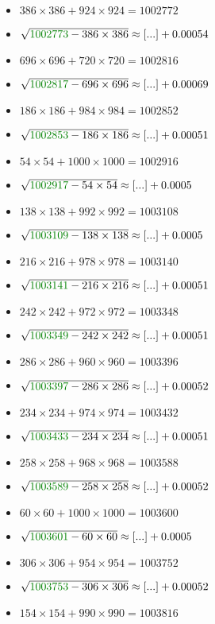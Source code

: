 \documentclass[12pt]{article}
\begin{document}
\begin{multicols}{2}
\begin{itemize}
\item $386\times386 + 924\times924 = 1002772$
\item $\sqrt{ {\color{green!50!black}{1002773}} - 386\times 386 } \approx [...] + 0.00054$
\item $696\times696 + 720\times720 = 1002816$
\item $\sqrt{ {\color{green!50!black}{1002817}} - 696\times 696 } \approx [...] + 0.00069$
\item $186\times186 + 984\times984 = 1002852$
\item $\sqrt{ {\color{green!50!black}{1002853}} - 186\times 186 } \approx [...] + 0.00051$
\item $54\times54 + 1000\times1000 = 1002916$
\item $\sqrt{ {\color{green!50!black}{1002917}} - 54\times 54 } \approx [...] + 0.0005$
\item $138\times138 + 992\times992 = 1003108$
\item $\sqrt{ {\color{green!50!black}{1003109}} - 138\times 138 } \approx [...] + 0.0005$
\item $216\times216 + 978\times978 = 1003140$
\item $\sqrt{ {\color{green!50!black}{1003141}} - 216\times 216 } \approx [...] + 0.00051$
\item $242\times242 + 972\times972 = 1003348$
\item $\sqrt{ {\color{green!50!black}{1003349}} - 242\times 242 } \approx [...] + 0.00051$
\item $286\times286 + 960\times960 = 1003396$
\item $\sqrt{ {\color{green!50!black}{1003397}} - 286\times 286 } \approx [...] + 0.00052$
\item $234\times234 + 974\times974 = 1003432$
\item $\sqrt{ {\color{green!50!black}{1003433}} - 234\times 234 } \approx [...] + 0.00051$
\item $258\times258 + 968\times968 = 1003588$
\item $\sqrt{ {\color{green!50!black}{1003589}} - 258\times 258 } \approx [...] + 0.00052$
\item $60\times60 + 1000\times1000 = 1003600$
\item $\sqrt{ {\color{green!50!black}{1003601}} - 60\times 60 } \approx [...] + 0.0005$
\item $306\times306 + 954\times954 = 1003752$
\item $\sqrt{ {\color{green!50!black}{1003753}} - 306\times 306 } \approx [...] + 0.00052$
\item $154\times154 + 990\times990 = 1003816$

\end{itemize}
\end{multicols}
\end{document}
